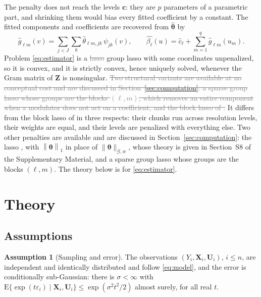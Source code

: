 \documentclass[12pt]{article} %
\theoremstyle{definition}
\newtheorem{assumption}{Assumption}
\theoremstyle{plain}
\newcommand{\E}{\mathrm{E}}
\newcommand{\norm}[1]{\left\lVert #1 \right\rVert}
\newcommand{\cv}{\ell}
\newcommand{\md}{m}
\newcommand{\lev}{j}
\newcommand{\tsl}{k}
\newcommand{\bX}{\mathbf{X}}
\newcommand{\bU}{\mathbf{U}}
\newcommand{\bZ}{\mathbf{Z}}
\newcommand{\fcoef}[1]{\beta_{#1}}
\newcommand{\wav}[2]{\psi_{#1#2}}
\newcommand{\btheta}{\boldsymbol{\theta}}
\newcommand{\thetahat}{\widehat{\btheta}}
\newcommand{\bc}{\mathbf{c}}
\newcommand{\nGw}[1]{\lVert #1\rVert_{\mathcal{G},w}}
\begin{document}
The penalty does not reach the levels $\bc$: they are $p$ parameters of a
parametric part, and shrinking them would bias every fitted coefficient by a
constant. The fitted components and coefficients are recovered from
$\thetahat$ by
\[
  \widehat{g}_{\cv\md}(v) = \sum_{\lev<J}\sum_{\tsl}
  \widehat{\theta}_{\cv\md,\lev\tsl}\,\wav{\lev}{\tsl}(v),
  \qquad
  \widehat{\fcoef{\cv}}(u) = \widehat{c}_{\cv}
  + \sum_{\md=1}^{q}\widehat{g}_{\cv\md}(u_{\md}).
\]
Problem \eqref{eq:estimator} is a \textcolor{gray}{\sout{lasso}} \textcolor{gray}{\sout{\mbox{\citep{tibshirani1996regression}}}}\textcolor{colR1}{group lasso \citep{Yuan-Lin-2006}} with some coordinates unpenalized, so
it is convex, and it is strictly convex, hence uniquely solved, whenever the
Gram matrix of $\bZ$ is nonsingular. \textcolor{gray}{\sout{Two structural variants are available at
no conceptual cost and are discussed in Section~\mbox{\ref{sec:computation}}: a
sparse group lasso \mbox{\citep{Simon-Friedman-Hastie-Tibshirani-2013}} whose groups
are the blocks $(\cv,\md)$, which removes an entire component when a modulator
does not act on a coefficient, and the block lasso of
\mbox{\citet{Klopp-Pensky-2015}}.}} \textcolor{colR1}{It differs from the block lasso of
\citet{Klopp-Pensky-2015} in three respects: their chunks run across resolution
levels, their weights are equal, and their levels are penalized with everything
else. Two other penalties are available and are discussed in
Section~\ref{sec:computation}: the lasso \citep{tibshirani1996regression}, with
$\norm{\btheta}_{1}$ in place of $\nGw{\btheta}$, whose theory is given in
Section~S8 of the Supplementary Material, and a sparse group lasso
\citep{Simon-Friedman-Hastie-Tibshirani-2013} whose groups are the blocks
$(\cv,\md)$.} The theory below is for \eqref{eq:estimator}.

\section{Theory}
\label{sec:theory}

\subsection{Assumptions}
\label{sec:assumptions}

\begin{assumption}[Sampling and error]
\label{ass:sample}
The observations $(Y_i,\bX_i,\bU_i)$, $i \le n$, are independent and
identically distributed and follow \eqref{eq:model}, and the error is
conditionally sub-Gaussian: there is $\sigma < \infty$ with
$\E\{\exp(t\varepsilon_i) \mid \bX_i,\bU_i\} \le \exp(\sigma^2t^2/2)$ almost
surely, for all real $t$.
\end{assumption}
\end{document}
